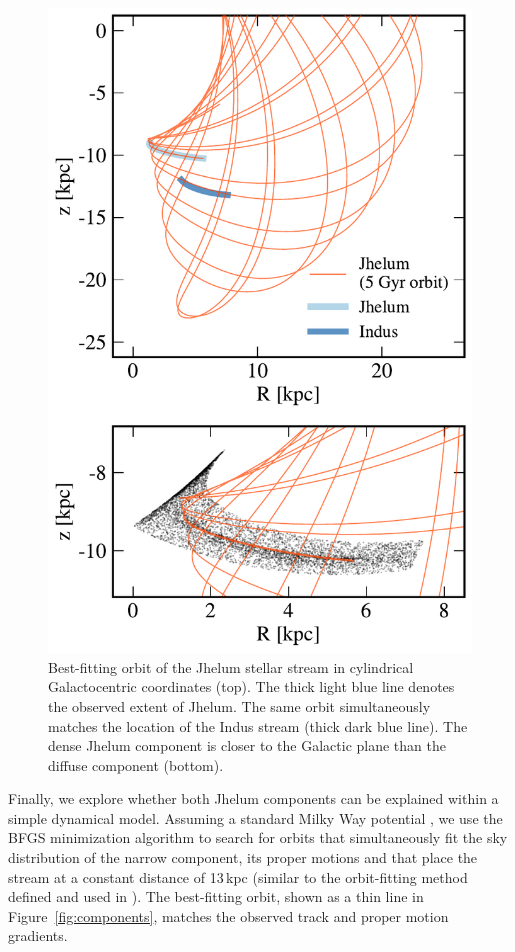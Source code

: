 \documentclass[twocolumn]{aastex62}
\begin{document}
\begin{figure}
\begin{center}
\includegraphics[width=\columnwidth]{orbit_cyl.pdf}
\end{center}
\caption{
Best-fitting orbit of the Jhelum stellar stream in cylindrical Galactocentric coordinates (top).
The thick light blue line denotes the observed extent of Jhelum.
The same orbit simultaneously matches the location of the Indus stream (thick dark blue line).
The dense Jhelum component is closer to the Galactic plane than the diffuse component (bottom).
}
\label{fig:galactocentric}
\end{figure}

Finally, we explore whether both Jhelum components can be explained within a simple dynamical model.
Assuming a standard Milky Way potential \citep{gala}, we use the BFGS minimization algorithm to search for orbits that simultaneously fit the sky distribution of the narrow component, its proper motions and that place the stream at a constant distance of 13\,kpc (similar to the orbit-fitting method defined and used in \citealt{pwb}).
The best-fitting orbit, shown as a thin line in Figure~\ref{fig:components}, matches the observed track and proper motion gradients.
\end{document}
